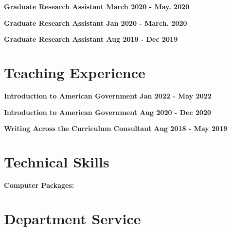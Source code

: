 \documentclass[margin]{res}
\newcommand{\fullhrulefill}{%
  \hspace*{-\sectionwidth}\hrulefill%
  }
\begin{document}
\begin{resume}
\textbf {Graduate Research Assistant \hfill {March 2020 - May. 2020} \\ }

\textbf {Graduate Research Assistant \hfill {Jan 2020 - March. 2020} \\ }

\textbf {Graduate Research Assistant \hfill {Aug 2019 - Dec 2019} \\ }


\fullhrulefill
\section {Teaching Experience}

\textbf {Introduction to American Government \hfill {Jan 2022 - May 2022} \\ }


\textbf {Introduction to American Government \hfill {Aug 2020 - Dec 2020} \\ }

\textbf {Writing Across the Curriculum Consultant \hfill {Aug 2018 - May 2019} \\ }

\fullhrulefill
\section{Technical Skills}
\textbf{Computer Packages:} 

\fullhrulefill
\section {Department Service}






\end{resume}
\(\)
\end{document}

